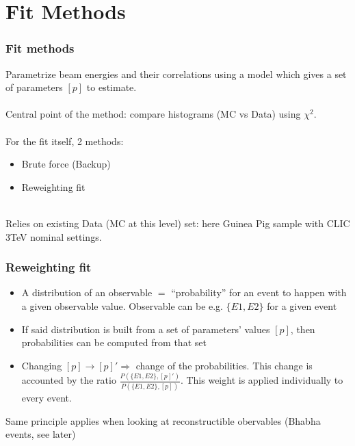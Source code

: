 \documentclass{beamer}
\begin{document}
\section{Fit Methods}
\begin{frame}
\frametitle{Fit methods}
Parametrize beam energies and their \alert{correlations} using a model which
gives a set of \alert{parameters $[p]$} to estimate. \\
~\\
Central point of the method: compare histograms (MC vs Data) using $\chi^2$. \\
~\\
For the fit itself, 2 methods:
\begin{itemize}
  \item Brute force (Backup)
  \item Reweighting fit
\end{itemize}
~\\
Relies on existing \alert{Data} (MC at this level) set: here Guinea Pig sample
with CLIC 3TeV nominal settings.\\

\end{frame}


\begin{frame}
\frametitle{Reweighting fit}
\begin{itemize}
  \item A \alert{distribution} of an observable $=$ \alert{``probability''} for
  an event to happen with a given observable value. Observable can be e.g.
  $\{E1,E2\}$ for a given event%
  \item If said distribution is built from a set of parameters' values
  $[p]$, then probabilities can be computed from that set
  \item Changing $[p]\to [p]'\Rightarrow$ change of the probabilities. This
  change is accounted by the ratio $\frac{P(\{E1,E2\},
  [p]')}{P(\{E1,E2\},[p])}$. This weight is applied individually to every
  event.
\end{itemize}
Same principle applies when looking at reconstructible obervables (Bhabha
events, see later)
\end{frame}
\end{document}
